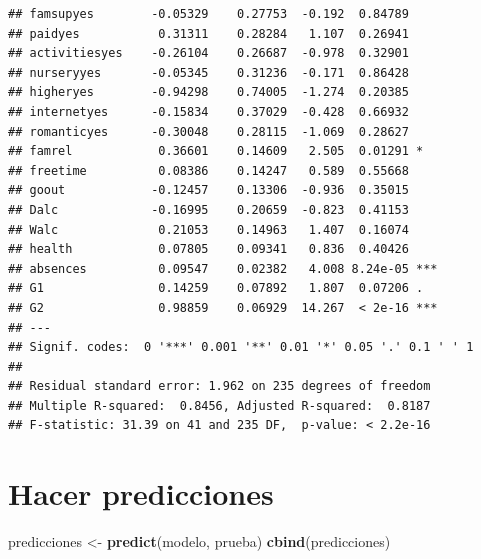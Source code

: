 \documentclass[
]{article}
\newenvironment{Shaded}{\begin{snugshade}}{\end{snugshade}}
\newcommand{\KeywordTok}[1]{\textcolor[rgb]{0.13,0.29,0.53}{\textbf{#1}}}
\newcommand{\NormalTok}[1]{#1}
\newcommand{\StringTok}[1]{\textcolor[rgb]{0.31,0.60,0.02}{#1}}
\begin{document}
\begin{verbatim}
## famsupyes        -0.05329    0.27753  -0.192  0.84789    
## paidyes           0.31311    0.28284   1.107  0.26941    
## activitiesyes    -0.26104    0.26687  -0.978  0.32901    
## nurseryyes       -0.05345    0.31236  -0.171  0.86428    
## higheryes        -0.94298    0.74005  -1.274  0.20385    
## internetyes      -0.15834    0.37029  -0.428  0.66932    
## romanticyes      -0.30048    0.28115  -1.069  0.28627    
## famrel            0.36601    0.14609   2.505  0.01291 *  
## freetime          0.08386    0.14247   0.589  0.55668    
## goout            -0.12457    0.13306  -0.936  0.35015    
## Dalc             -0.16995    0.20659  -0.823  0.41153    
## Walc              0.21053    0.14963   1.407  0.16074    
## health            0.07805    0.09341   0.836  0.40426    
## absences          0.09547    0.02382   4.008 8.24e-05 ***
## G1                0.14259    0.07892   1.807  0.07206 .  
## G2                0.98859    0.06929  14.267  < 2e-16 ***
## ---
## Signif. codes:  0 '***' 0.001 '**' 0.01 '*' 0.05 '.' 0.1 ' ' 1
## 
## Residual standard error: 1.962 on 235 degrees of freedom
## Multiple R-squared:  0.8456, Adjusted R-squared:  0.8187 
## F-statistic: 31.39 on 41 and 235 DF,  p-value: < 2.2e-16
\end{verbatim}

\hypertarget{hacer-predicciones}{%
\section{Hacer predicciones}\label{hacer-predicciones}}

\begin{Shaded}
\begin{Highlighting}[]
\NormalTok{predicciones <-}\StringTok{ }\KeywordTok{predict}\NormalTok{(modelo, prueba)}
\KeywordTok{cbind}\NormalTok{(predicciones)}
\end{Highlighting}
\end{Shaded}
\end{document}
